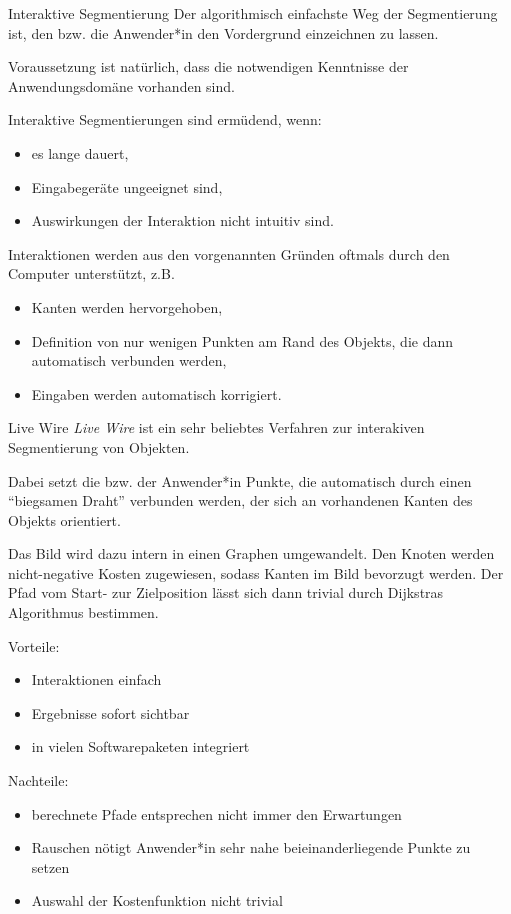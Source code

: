 \begin{defi}{Interaktive Segmentierung}
    Der algorithmisch einfachste Weg der Segmentierung ist, den bzw. die Anwender*in den Vordergrund einzeichnen zu lassen.

    Voraussetzung ist natürlich, dass die notwendigen Kenntnisse der Anwendungsdomäne vorhanden sind.

    Interaktive Segmentierungen sind ermüdend, wenn:
    \begin{itemize}
        \item es lange dauert,
        \item Eingabegeräte ungeeignet sind,
        \item Auswirkungen der Interaktion nicht intuitiv sind.
    \end{itemize}

    Interaktionen werden aus den vorgenannten Gründen oftmals durch den Computer unterstützt, z.B.
    \begin{itemize}
        \item Kanten werden hervorgehoben,
        \item Definition von nur wenigen Punkten am Rand des Objekts, die dann automatisch verbunden werden,
        \item Eingaben werden automatisch korrigiert.
    \end{itemize}
\end{defi}

\begin{defi}{Live Wire}
    \emph{Live Wire} ist ein sehr beliebtes Verfahren zur interakiven Segmentierung von Objekten.

    Dabei setzt die bzw. der Anwender*in Punkte, die automatisch durch einen \enquote{biegsamen Draht} verbunden werden, der sich an vorhandenen Kanten des Objekts orientiert.

    Das Bild wird dazu intern in einen Graphen umgewandelt.
    Den Knoten werden nicht-negative Kosten zugewiesen, sodass Kanten im Bild bevorzugt werden.
    Der Pfad vom Start- zur Zielposition lässt sich dann trivial durch Dijkstras Algorithmus bestimmen.

    Vorteile:
    \begin{itemize}
        \item Interaktionen einfach
        \item Ergebnisse sofort sichtbar
        \item in vielen Softwarepaketen integriert
    \end{itemize}

    Nachteile:
    \begin{itemize}
        \item berechnete Pfade entsprechen nicht immer den Erwartungen
        \item Rauschen nötigt Anwender*in sehr nahe beieinanderliegende Punkte zu setzen
        \item Auswahl der Kostenfunktion nicht trivial
    \end{itemize}
\end{defi}

